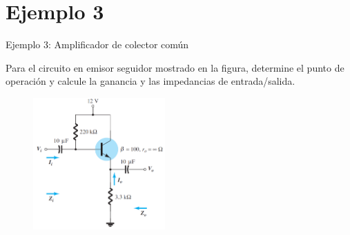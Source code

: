\documentclass[t,aspectratio=169]{beamer}
\begin{document}
\section{Ejemplo 3}
\begin{frame}{Ejemplo 3: Amplificador de colector común}

Para el circuito en emisor seguidor mostrado en la figura, determine el punto de operación y calcule la ganancia y las impedancias de entrada/salida.

\begin{figure}[H]
    \centering
    \includegraphics[width=0.45\textwidth]{figuras/modelo_re_colector_comun_3.png}
\end{figure}

\end{frame}
\end{document}

